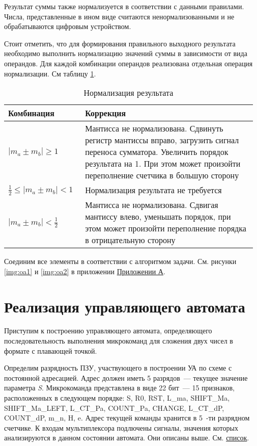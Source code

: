 \documentclass[a4paper,14pt]{extarticle}
\begin{document}
Результат суммы также нормализуется в соответствии с данными правилами. Числа, представленные в ином виде считаются ненормализованными и не обрабатываются цифровым устройством.

Стоит отметить, что для формирования правильного выходного результата необходимо выполнить нормализацию значений суммы в зависимости от вида операндов. Для каждой комбинации операндов реализована отдельная операция нормализации. См таблицу \ref{tab:correction}.

\begin{table}
	\small
	\begin{tabular}{|m{0.3\linewidth}|m{0.67\linewidth}|}
		\hline
		\textbf{Комбинация} &\textbf{Коррекция}\\
		\hline
		 $\left|m_a\pm m_b\right|\ge1$ & Мантисса не нормализована. Сдвинуть регистр мантиссы вправо, загрузить сигнал переноса сумматора. Увеличить порядок результата на 1. При этом может произойти переполнение счетчика в большую сторону \\ 
		\hline
		$\frac12\le \left|m_a\pm m_b\right|< 1$ & Нормализация результата не требуется\\
		\hline
		$\left|m_a\pm m_b\right|<\frac12$ & Мантисса не нормализована. Сдвигая мантиссу влево, уменьшать порядок, при этом может произойти переполнение порядка в отрицательную сторону\\
		\hline
	\end{tabular}
	\caption{Нормализация результата}
	\label{tab:correction}
\end{table}

Соединим все элементы в соответствии с алгоритмом задачи. См. рисунки \ref{img:oa1} и \ref{img:oa2} в приложении \hyperref[tam]{Приложении А}.

\section {Реализация управляющего автомата}
Приступим к построению управляющего автомата, определяющего последовательность выполнения микрокоманд для сложения двух чисел в формате с плавающей точкой.

Определим разрядность ПЗУ, участвующего в построении УА по схеме с постоянной адресацией. Адрес должен иметь 5 разрядов~--- текущее значение параметра \textit{S}. Микрокоманда представлена в виде 22 бит~--- 15 признаков, расположенных в следующем порядке: S,	R0,	RST,	L\_ma,	SHIFT\_Ma,	SHIFT\_Ma\_LEFT,	L\_CT\_Pa,	COUNT\_Pa,	CHANGE,	L\_CT\_dP,	COUNT\_dP,	m\_n,	H,	e. Адрес текущей команды хранится в 5~-ти разрядном счетчике. К входам мультиплексора подлючены сигналы, значения которых анализируются в данном состоянии автомата. Они описаны выше. См. \hyperlink{name}{список}.
\end{document}
